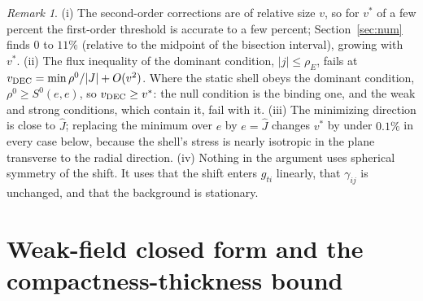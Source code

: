 \documentclass[11pt,a4paper]{article}
\theoremstyle{remark}
\newtheorem{remark}{Remark}
\begin{document}
\begin{remark}
(i) The second-order corrections are of relative size $v$, so for $v^*$ of a few percent the first-order threshold is accurate to a few percent; Section~\ref{sec:num} finds $0$ to $11\%$ (relative to the midpoint of the bisection interval), growing with $v^*$.
(ii) The flux inequality of the dominant condition, $|j| \le \rho_E$, fails at $v_{\rm DEC} = \min\rho^0/|J| + O(v^2)$. Where the static shell obeys the dominant condition, $\rho^0 \ge S^0(e,e)$, so $v_{\rm DEC} \ge v^*$: the null condition is the binding one, and the weak and strong conditions, which contain it, fail with it.
(iii) The minimizing direction is close to $\hat J$; replacing the minimum over $e$ by $e = \hat J$ changes $v^*$ by under $0.1\%$ in every case below, because the shell's stress is nearly isotropic in the plane transverse to the radial direction.
(iv) Nothing in the argument uses spherical symmetry of the shift. It uses that the shift enters $g_{ti}$ linearly, that $\gamma_{ij}$ is unchanged, and that the background is stationary.
\end{remark}

\section{Weak-field closed form and the compactness-thickness bound}\label{sec:weak}
\end{document}
